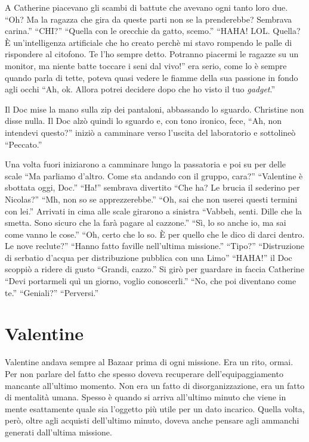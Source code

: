     A Catherine piacevano gli scambi di battute che avevano ogni tanto loro due. ``Oh? Ma la ragazza che gira da queste
    parti non se la prenderebbe? Sembrava carina.'' ``CHI?'' ``Quella con le orecchie da gatto, scemo.'' ``HAHA! LOL.
    Quella? È un'intelligenza artificiale che ho creato perchè mi stavo rompendo le palle di rispondere al citofono. Te
    l'ho sempre detto. Potranno piacermi le ragazze su un monitor, ma niente batte toccare i seni dal vivo!'' era serio,
    come lo è sempre quando parla di tette, poteva quasi vedere le fiamme della sua passione in fondo agli occhi ``Ah,
    ok. Allora potrei decidere dopo che ho visto il tuo \emph{gadget}.''

    Il Doc mise la mano sulla zip dei pantaloni, abbassando lo sguardo. Christine non disse nulla. Il Doc alzò quindi lo
    sguardo e, con tono ironico, fece, ``Ah, non intendevi questo?'' iniziò a camminare verso l'uscita del laboratorio e
    sottolineò ``Peccato.''

    Una volta fuori iniziarono a camminare lungo la passatoria e poi su per delle scale ``Ma parliamo d'altro. Come sta
    andando con il gruppo, cara?'' ``Valentine è sbottata oggi, Doc.'' ``Ha!'' sembrava divertito ``Che ha? Le brucia il
    sederino per Nicolas?'' ``Mh, non so se apprezzerebbe.'' ``Oh, sai che non userei questi termini con lei.'' Arrivati
    in cima alle scale girarono a sinistra ``Vabbeh, senti. Dille che la smetta. Sono sicuro che la farà pagare al
    cazzone.'' ``Sì, lo so anche io, ma sai come vanno le cose.'' ``Oh, certo che lo so. È per quello che le dico di
    darci dentro. Le nove reclute?'' ``Hanno fatto faville nell'ultima missione.'' ``Tipo?'' ``Distruzione di serbatio
    d'acqua per distribuzione pubblica con una Limo'' ``HAHA!'' il Doc scoppiò a ridere di gusto ``Grandi, cazzo.'' Si
    girò per guardare in faccia Catherine ``Devi portarmeli quì un giorno, voglio conoscerli.'' ``No, che poi diventano
    come te.'' ``Geniali?'' ``Perversi.''

  \section*{Valentine}
    
    Valentine andava sempre al Bazaar prima di ogni missione. Era un rito, ormai. Per non parlare del fatto che spesso
    doveva recuperare dell'equipaggiamento mancante all'ultimo momento. Non era un fatto di disorganizzazione, era un
    fatto di mentalità umana. Spesso è quando si arriva all'ultimo minuto che viene in mente esattamente quale sia
    l'oggetto più utile per un dato incarico. Quella volta, però, oltre agli acquisti dell'ultimo minuto, doveva anche
    pensare agli ammanchi generati dall'ultima missione.

